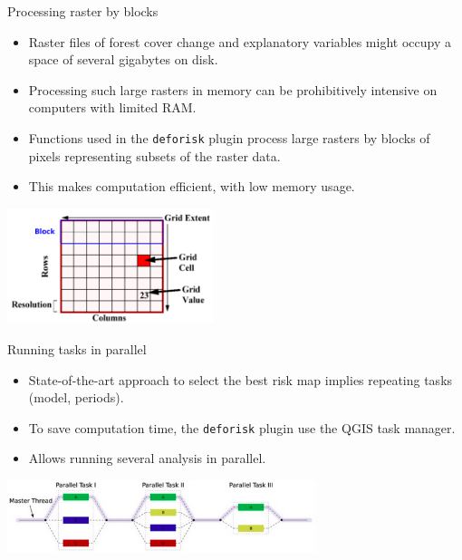 \documentclass[10pt,table,dvipsnames,compress]{beamer}
\begin{document}
\begin{frame}[label={sec:orgf1660cc},fragile]{Processing raster by blocks}
 \begin{itemize}
\item Raster files of forest cover change and explanatory variables might occupy a space of several gigabytes on disk.
\item Processing such large rasters in memory can be prohibitively intensive on computers with limited RAM.
\item Functions used in the \texttt{deforisk} plugin process large rasters by blocks of pixels representing subsets of the raster data.
\item This makes computation efficient, with low memory usage.
\end{itemize}

\begin{center}
\includegraphics[width=6cm]{figs/raster_block.png}
\end{center}
\end{frame}

\begin{frame}[label={sec:org6dbff18},fragile]{Running tasks in parallel}
 \begin{itemize}
\item State-of-the-art approach to select the best risk map implies repeating tasks (model, periods).
\item To save computation time, the \texttt{deforisk} plugin use the QGIS task manager.
\item Allows running several analysis in parallel.
\end{itemize}

\vspace{0.25cm}

\begin{center}
\includegraphics[width=9cm]{figs/parallel_tasks.png}
\end{center}
\end{frame}
\end{document}
